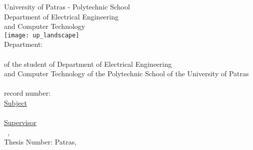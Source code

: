 \begin{titlepage}
\begin{center}
{\large University of Patras - Polytechnic School}\\
\large Department of Electrical Engineering\\and Computer Technology\\
\hfill \break
\texttt{[image: up\_landscape]}\\
\hfill \break
{\Large Department: \division}\\[1cm]

{\uline{\LARGE{\shortdoctitle }}}\\ [0.5cm]
of the student of Department of Electrical Engineering\\
and Computer Technology of the Polytechnic School of the University of Patras\\[1cm]

{\LARGE \me }\\[0.5cm]
{\Large record number: \studnum}\\[1cm]

\uline{\large Subject}\\[0.5cm]
\textbf{\large \doctitle }\\[1cm]
\uline{\large Supervisor}\\[0.5cm]
\large \suptitle \, \supname, \uni \\[1cm]
\large{Thesis Number: }\hspace{3cm}
\vfill
\large{Patras, \monthyear}
\end{center}
\end{titlepage}
